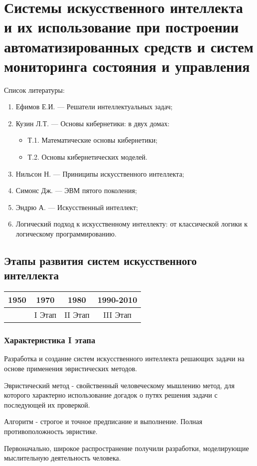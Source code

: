 \documentclass[a4paper,12pt]{report}
\begin{document}
\chapter{Системы искусственного интеллекта и их использование при построении
	автоматизированных средств и систем мониторинга состояния и управления}

Список литературы:

\begin{enumerate}
	\item Ефимов Е.И. --- Решатели интеллектуальных задач;
	\item Кузин Л.Т. --- Основы кибернетики: в двух домах:
		\begin{itemize}
			\item Т.1. Математические основы кибернетики;
			\item Т.2. Основы кибернетических моделей.
		\end{itemize}
	\item Нильсон Н. --- Приниципы искусственного интеллекта;
	\item Симонс Дж. --- ЭВМ пятого поколения;
	\item Эндрю А. --- Искусственный интеллект;
	\item Логический подход к искусственному интеллекту: от классической логики
		к логическому программированию.
\end{enumerate}


\section{Этапы развития систем искусственного интеллекта}

\begin{tabular}{ c | c | c | c }
	1950 & 1970 & 1980 & 1990-2010 \\
	\hline
	& I Этап & II Этап & III Этап
\end{tabular}


\subsection{Характеристика I этапа}
	Разработка и создание систем искусственного интеллекта
	решающих задачи на основе применения эвристических методов. \par
	Эвристический метод - свойственный человеческому мышлению метод, для которого
	характерно использование догадок о путях решения задачи с последующей их
	проверкой. \par
	Алгоритм - строгое и точное предписание и выполнение. Полная
	противоположность эвристике. \par
	Первоначально, широкое распространение получили разработки,
	моделирующие мыслительную деятельность человека.\par
\end{document}
